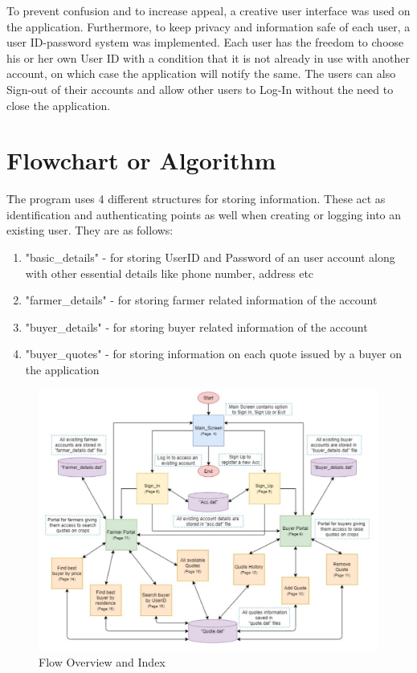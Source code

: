 \documentclass[12pt]{article}
\begin{document}
To prevent confusion and to increase appeal, a creative user interface was used on the application. Furthermore, to keep privacy and information safe of each user, a user ID-password system was implemented. Each user has the freedom to choose his or her own User ID with a condition that it is not already in use with another account, on which case the application will notify the same. The users can also Sign-out of their accounts and allow other users to Log-In without the need to close the application.



\newpage                            %
\section{Flowchart or Algorithm}    %

\h The program uses 4 different structures for storing information. These act as identification and authenticating points as well when creating or logging into an existing user. They are as follows:

\begin{enumerate}
    \item "basic\_details" - for storing UserID and Password of an user account along with other essential details like phone number, address etc
    \item "farmer\_details" - for storing farmer related information of the account
    \item "buyer\_details" - for storing buyer related information of the account
    \item "buyer\_quotes" - for storing information on each quote issued by a buyer on the application
\end{enumerate}


\begin{figure}[h!]
    \centering
    \includegraphics[width = \columnwidth]{Overview.JPG}
    \caption{Flow Overview and Index}
\end{figure}
\end{document}
